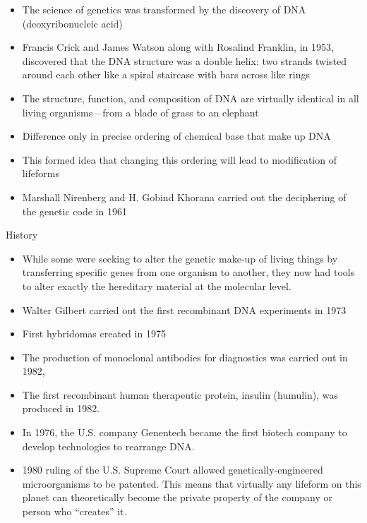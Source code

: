 \documentclass[ignorenonframetext,aspectratio=169]{beamer}
\providecommand{\tightlist}{%
  \setlength{\itemsep}{0pt}\setlength{\parskip}{0pt}}
\begin{document}
\begin{itemize}
\tightlist
\item
  The science of genetics was transformed by the discovery of DNA
  (deoxyribonucleic acid)
\item
  Francis Crick and James Watson along with Rosalind Franklin, in 1953,
  discovered that the DNA structure was a double helix: two strands
  twisted around each other like a spiral staircase with bars across
  like rings
\item
  The structure, function, and composition of DNA are virtually
  identical in all living organisms---from a blade of grass to an
  elephant
\item
  Difference only in precise ordering of chemical base that make up DNA
\item
  This formed idea that changing this ordering will lead to modification
  of lifeforms
\item
  Marshall Nirenberg and H. Gobind Khorana carried out the deciphering
  of the genetic code in 1961
\end{itemize}

\begin{frame}{History}
\protect\hypertarget{history-1}{}

\begin{itemize}
\tightlist
\item
  While some were seeking to alter the genetic make-up of living things
  by transferring specific genes from one organism to another, they now
  had tools to alter exactly the hereditary material at the molecular
  level.
\item
  Walter Gilbert carried out the first recombinant DNA experiments in
  1973
\item
  First hybridomas created in 1975
\item
  The production of monoclonal antibodies for diagnostics was carried
  out in 1982,
\item
  The first recombinant human therapeutic protein, insulin (humulin),
  was produced in 1982.
\item
  In 1976, the U.S. company Genentech became the first biotech company
  to develop technologies to rearrange DNA.
\item
  1980 ruling of the U.S. Supreme Court allowed genetically-engineered
  microorganisms to be patented. This means that virtually any lifeform
  on this planet can theoretically become the private property of the
  company or person who ``creates'' it.
\end{itemize}

\end{frame}
\end{document}
